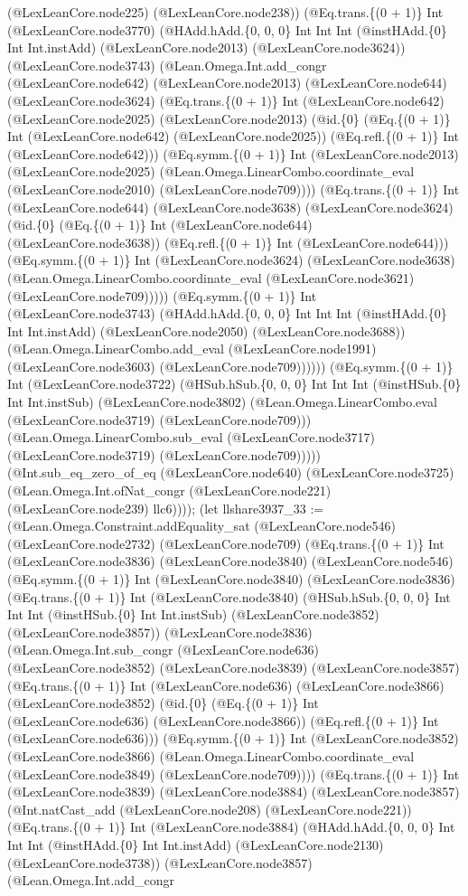\documentclass[11pt]{article}
\begin{document}
(@LexLeanCore.node225) (@LexLeanCore.node238)) (@Eq.trans.\{(0 + 1)\} Int (@LexLeanCore.node3770) (@HAdd.hAdd.\{0, 0, 0\} Int Int Int (@instHAdd.\{0\} Int Int.instAdd) (@LexLeanCore.node2013) (@LexLeanCore.node3624)) (@LexLeanCore.node3743) (@Lean.Omega.Int.add\_congr (@LexLeanCore.node642) (@LexLeanCore.node2013) (@LexLeanCore.node644) (@LexLeanCore.node3624) (@Eq.trans.\{(0 + 1)\} Int (@LexLeanCore.node642) (@LexLeanCore.node2025) (@LexLeanCore.node2013) (@id.\{0\} (@Eq.\{(0 + 1)\} Int (@LexLeanCore.node642) (@LexLeanCore.node2025)) (@Eq.refl.\{(0 + 1)\} Int (@LexLeanCore.node642))) (@Eq.symm.\{(0 + 1)\} Int (@LexLeanCore.node2013) (@LexLeanCore.node2025) (@Lean.Omega.LinearCombo.coordinate\_eval (@LexLeanCore.node2010) (@LexLeanCore.node709)))) (@Eq.trans.\{(0 + 1)\} Int (@LexLeanCore.node644) (@LexLeanCore.node3638) (@LexLeanCore.node3624) (@id.\{0\} (@Eq.\{(0 + 1)\} Int (@LexLeanCore.node644) (@LexLeanCore.node3638)) (@Eq.refl.\{(0 + 1)\} Int (@LexLeanCore.node644))) (@Eq.symm.\{(0 + 1)\} Int (@LexLeanCore.node3624) (@LexLeanCore.node3638) (@Lean.Omega.LinearCombo.coordinate\_eval (@LexLeanCore.node3621) (@LexLeanCore.node709))))) (@Eq.symm.\{(0 + 1)\} Int (@LexLeanCore.node3743) (@HAdd.hAdd.\{0, 0, 0\} Int Int Int (@instHAdd.\{0\} Int Int.instAdd) (@LexLeanCore.node2050) (@LexLeanCore.node3688)) (@Lean.Omega.LinearCombo.add\_eval (@LexLeanCore.node1991) (@LexLeanCore.node3603) (@LexLeanCore.node709)))))) (@Eq.symm.\{(0 + 1)\} Int (@LexLeanCore.node3722) (@HSub.hSub.\{0, 0, 0\} Int Int Int (@instHSub.\{0\} Int Int.instSub) (@LexLeanCore.node3802) (@Lean.Omega.LinearCombo.eval (@LexLeanCore.node3719) (@LexLeanCore.node709))) (@Lean.Omega.LinearCombo.sub\_eval (@LexLeanCore.node3717) (@LexLeanCore.node3719) (@LexLeanCore.node709))))) (@Int.sub\_eq\_zero\_of\_eq (@LexLeanCore.node640) (@LexLeanCore.node3725) (@Lean.Omega.Int.ofNat\_congr (@LexLeanCore.node221) (@LexLeanCore.node239) llc6)))); (let llshare3937\_33 := (@Lean.Omega.Constraint.addEquality\_sat (@LexLeanCore.node546) (@LexLeanCore.node2732) (@LexLeanCore.node709) (@Eq.trans.\{(0 + 1)\} Int (@LexLeanCore.node3836) (@LexLeanCore.node3840) (@LexLeanCore.node546) (@Eq.symm.\{(0 + 1)\} Int (@LexLeanCore.node3840) (@LexLeanCore.node3836) (@Eq.trans.\{(0 + 1)\} Int (@LexLeanCore.node3840) (@HSub.hSub.\{0, 0, 0\} Int Int Int (@instHSub.\{0\} Int Int.instSub) (@LexLeanCore.node3852) (@LexLeanCore.node3857)) (@LexLeanCore.node3836) (@Lean.Omega.Int.sub\_congr (@LexLeanCore.node636) (@LexLeanCore.node3852) (@LexLeanCore.node3839) (@LexLeanCore.node3857) (@Eq.trans.\{(0 + 1)\} Int (@LexLeanCore.node636) (@LexLeanCore.node3866) (@LexLeanCore.node3852) (@id.\{0\} (@Eq.\{(0 + 1)\} Int (@LexLeanCore.node636) (@LexLeanCore.node3866)) (@Eq.refl.\{(0 + 1)\} Int (@LexLeanCore.node636))) (@Eq.symm.\{(0 + 1)\} Int (@LexLeanCore.node3852) (@LexLeanCore.node3866) (@Lean.Omega.LinearCombo.coordinate\_eval (@LexLeanCore.node3849) (@LexLeanCore.node709)))) (@Eq.trans.\{(0 + 1)\} Int (@LexLeanCore.node3839) (@LexLeanCore.node3884) (@LexLeanCore.node3857) (@Int.natCast\_add (@LexLeanCore.node208) (@LexLeanCore.node221)) (@Eq.trans.\{(0 + 1)\} Int (@LexLeanCore.node3884) (@HAdd.hAdd.\{0, 0, 0\} Int Int Int (@instHAdd.\{0\} Int Int.instAdd) (@LexLeanCore.node2130) (@LexLeanCore.node3738)) (@LexLeanCore.node3857) (@Lean.Omega.Int.add\_congr 
\end{document}

